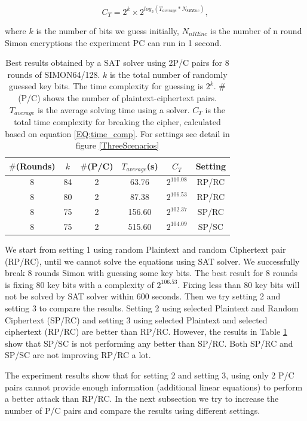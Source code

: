 \begin{equation} \label{EQ:time_comp}
C_T=2^{k}\times2^{log_2(T_{average}*N_{8REnc})},
\end{equation}

where $k$ is the number of bits we guess initially, $N_{nREnc}$ is the number of n round Simon encryptions the experiment PC can run in 1 second.

\begin{table}[!hh]
	\caption[Best results obtained by a SAT solver using 2P/C pairs]{Best results obtained by a SAT solver using 2P/C pairs for 8 rounds of SIMON64/128. $k$ is the total number of randomly guessed key bits. The time complexity for guessing is $2^{k}$. $\#$(P/C) shows the number of plaintext-ciphertext pairs. $T_{average}$ is the average solving time using a solver. $C_T$  is the total time complexity for breaking the cipher, calculated based on equation \ref{EQ:time_comp}. For settings see detail in figure \ref{ThreeScenarios}}\label{tab:example1} \centering
	\begin{tabular}{|c|c|c|c|c|c|}
		\hline
		$\#$(Rounds) & $k$ & $\#$(P/C) & $T_{average}$(s) & $C_T$ & Setting \\
		\hline
		8 & 84 & 2 & 63.76   & $2^{110.08}$ & RP/RC \\
		8 & 80 & 2 & 87.38   & $2^{106.53}$ & RP/RC \\
		\hline
		8 & 75 & 2 & 156.60  & $2^{102.37}$ & SP/RC \\
		\hline
		8 & 75 & 2 & 515.60  & $2^{104.09}$ & SP/SC \\
		\hline
	\end{tabular}
\end{table}

We start from setting 1 using random Plaintext and random Ciphertext pair (RP/RC), until we cannot solve the equations using SAT solver. We successfully break 8 rounds Simon with guessing some key bits. The best result for 8 rounds is fixing 80 key bits with a complexity of $2^{106.53}$. Fixing less than 80 key bits will not be solved by SAT solver within 600 seconds. Then we try setting 2 and setting 3 to compare the results. Setting 2 using selected Plaintext and Random Ciphertext (SP/RC) and setting 3 using selected Plaintext and selected ciphertext (RP/RC) are better than RP/RC. However, the results in Table \ref{tab:example1} show that SP/SC is not performing any better than SP/RC. Both SP/RC and SP/SC are not improving RP/RC a lot. 

The experiment results show that for setting 2 and setting 3, using only 2 P/C pairs cannot provide enough information (additional linear equations) to perform a better attack than RP/RC. In the next subsection we try to increase the number of P/C pairs and compare the results using different settings.

